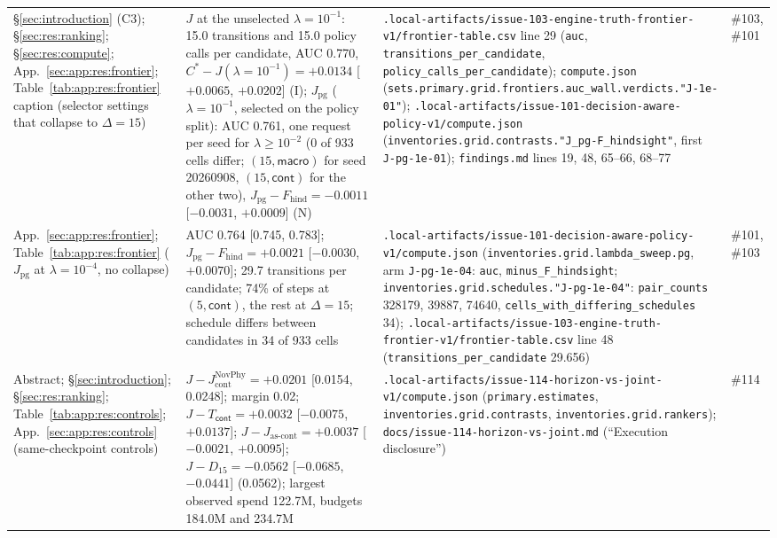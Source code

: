 {\begin{revblock}
\begin{longtable}{@{}>{\raggedright\arraybackslash}p{}>{\raggedright\arraybackslash}p{}>{\raggedright\arraybackslash}p{}>{\raggedright\arraybackslash}p{}@{}}
\S\ref{sec:introduction} (C3); \S\ref{sec:res:ranking}; \S\ref{sec:res:compute}; App.~\ref{sec:app:res:frontier}; Table~\ref{tab:app:res:frontier} caption (selector settings that collapse to $\Delta=15$) & $J$ at the unselected $\lambda=10^{-1}$: 15.0 transitions and 15.0 policy calls per candidate, AUC 0.770, $C^{*}-J(\lambda{=}10^{-1})=+0.0134$ [$+0.0065$, $+0.0202$] (I); $J_{\mathrm{pg}}$ ($\lambda=10^{-1}$, selected on the policy split): AUC 0.761, one request per seed for $\lambda\geq10^{-2}$ (0 of 933 cells differ; $(15,\textsf{macro})$ for seed 20260908, $(15,\textsf{cont})$ for the other two), $J_{\mathrm{pg}}-F_{\mathrm{hind}}=-0.0011$ [$-0.0031$, $+0.0009$] (N) & \nolinkurl{.local-artifacts/issue-103-engine-truth-frontier-v1/frontier-table.csv} line 29 (\texttt{auc}, \texttt{transitions\_per\_candidate}, \texttt{policy\_calls\_per\_candidate}); \nolinkurl{compute.json} (\nolinkurl{sets.primary.grid.frontiers.auc_wall.verdicts."J-1e-01"}); \nolinkurl{.local-artifacts/issue-101-decision-aware-policy-v1/compute.json} (\nolinkurl{inventories.grid.contrasts."J_pg-F_hindsight"}, first \texttt{J-pg-1e-01}); \nolinkurl{findings.md} lines 19, 48, 65--66, 68--77 & \#103, \#101 \\
App.~\ref{sec:app:res:frontier}; Table~\ref{tab:app:res:frontier} ($J_{\mathrm{pg}}$ at $\lambda=10^{-4}$, no collapse) & AUC 0.764 [0.745, 0.783]; $J_{\mathrm{pg}}-F_{\mathrm{hind}}=+0.0021$ [$-0.0030$, $+0.0070$]; 29.7 transitions per candidate; 74\% of steps at $(5,\textsf{cont})$, the rest at $\Delta=15$; schedule differs between candidates in 34 of 933 cells & \nolinkurl{.local-artifacts/issue-101-decision-aware-policy-v1/compute.json} (\nolinkurl{inventories.grid.lambda_sweep.pg}, arm \texttt{J-pg-1e-04}: \texttt{auc}, \texttt{minus\_F\_hindsight}; \nolinkurl{inventories.grid.schedules."J-pg-1e-04"}: \texttt{pair\_counts} 328179, 39887, 74640, \texttt{cells\_with\_differing\_schedules} 34); \nolinkurl{.local-artifacts/issue-103-engine-truth-frontier-v1/frontier-table.csv} line 48 (\texttt{transitions\_per\_candidate} 29.656) & \#101, \#103 \\
Abstract; \S\ref{sec:introduction}; \S\ref{sec:res:ranking}; Table~\ref{tab:app:res:controls}; App.~\ref{sec:app:res:controls} (same-checkpoint controls) & $J-J_{\mathrm{cont}}^{\mathrm{NovPhy}}=+0.0201$ [0.0154, 0.0248]; margin 0.02; $J-T_{\textsf{cont}}=+0.0032$ [$-0.0075$, $+0.0137$]; $J-J_{\text{as-cont}}=+0.0037$ [$-0.0021$, $+0.0095$]; $J-D_{15}=-0.0562$ [$-0.0685$, $-0.0441$] (0.0562); largest observed spend 122.7M, budgets 184.0M and 234.7M & \nolinkurl{.local-artifacts/issue-114-horizon-vs-joint-v1/compute.json} (\nolinkurl{primary.estimates}, \nolinkurl{inventories.grid.contrasts}, \nolinkurl{inventories.grid.rankers}); \nolinkurl{docs/issue-114-horizon-vs-joint.md} (``Execution disclosure'') & \#114 \\

\end{longtable}
\end{revblock}}

